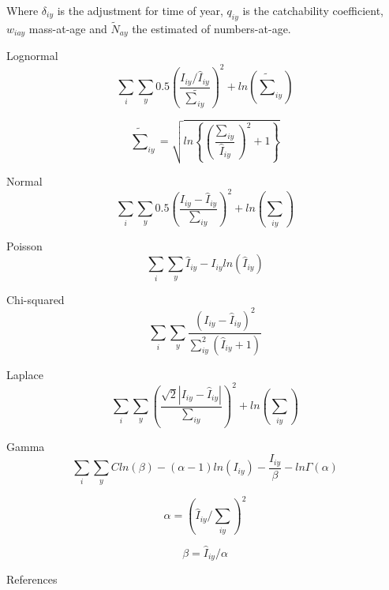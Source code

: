 \documentclass[a4paper,10pt]{article}
\begin{document}
Where $\delta_{iy}$ is the adjustment for time of year, $q_{iy}$ is the catchability coefficient, $w_{iay}$ mass-at-age and $\tilde{N}_{ay}$ the estimated of numbers-at-age.




Lognormal
\begin{equation}\label{eq3}
\sum_i \sum_y 0.5\left( \frac{I_{iy}/\hat{I}_{iy}}{\tilde{\sum}_{iy}} \right)^2 +ln(\tilde{\sum}_{iy})
\end{equation}

\begin{equation}\label{eq3b}
\tilde{\sum}_{iy} = \sqrt{ ln\left\{\left( \frac{\sum_{iy}}{\hat{I}_{iy}} \right)^2+1 \right\}}
\end{equation}

Normal
\begin{equation}\label{eq4}
\sum_i \sum_y 0.5\left( \frac{I_{iy}-\hat{I}_{iy}}{{\sum}_{iy}} \right)^2 +ln({\sum}_{iy})
\end{equation}

Poisson
\begin{equation}\label{eq5}
\sum_i \sum_y \hat{I}_{iy}-I_{iy}ln(\hat{I}_{iy})
\end{equation}

Chi-squared
\begin{equation}\label{eq6}
\sum_i \sum_y \frac{(I_{iy}-\hat{I}_{iy})^2}{\sum^2_{iy}(\hat{I}_{iy}+1)} 
\end{equation}

Laplace
\begin{equation}\label{eq7}
\sum_i \sum_y \left( \frac{\sqrt{2} |I_{iy}-\hat{I}_{iy}|}{\sum_{iy}}\right)^2  +ln({\sum}_{iy})
\end{equation}

Gamma
\begin{equation}\label{eq8}
\sum_i \sum_y C ln(\beta)-(\alpha-1) ln(I_{iy})-\frac{I_{iy}}{\beta} -ln\Gamma(\alpha)
\end{equation}

\begin{equation}\label{eq8a}
\alpha=(\hat{I}_{iy}/\sum_{iy})^2
\end{equation}

\begin{equation}\label{eq8b}
\beta=\hat{I}_{iy}/\alpha
\end{equation}

\clearpage
 
 



References
\end{document}
